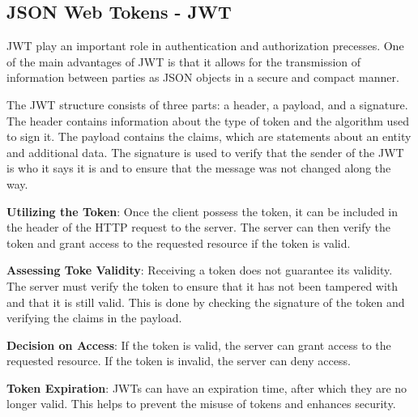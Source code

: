 \subsection{JSON Web Tokens - JWT}
JWT play an important role in authentication and authorization precesses. One of the main advantages of JWT is that it allows for the transmission of information 
between parties as JSON objects in a secure and compact manner. 

The JWT structure consists of three parts: a header, a payload, and a signature. The header contains information about the type of token and the algorithm used
to sign it. The payload contains the claims, which are statements about an entity and additional data. The signature is used to verify that the sender of the JWT
is who it says it is and to ensure that the message was not changed along the way.

\textbf{Utilizing the Token}: Once the client possess the token, it can be included in the header of the HTTP request to the server. The server can then verify 
the token and grant access to the requested resource if the token is valid.

\textbf{Assessing Toke Validity}: Receiving a token does not guarantee its validity. The server must verify the token to ensure that it has not been tampered with
and that it is still valid. This is done by checking the signature of the token and verifying the claims in the payload.

\textbf{Decision on Access}: If the token is valid, the server can grant access to the requested resource. If the token is invalid, the server can deny access.

\textbf{Token Expiration}: JWTs can have an expiration time, after which they are no longer valid. This helps to prevent the misuse of tokens and enhances security.



